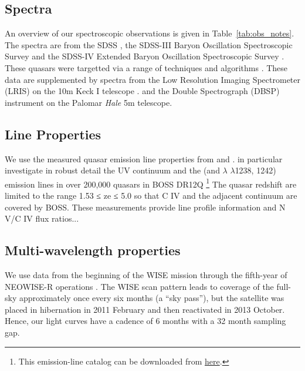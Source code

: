 \documentclass[a4paper,fleqn,usenatbib]{mnras}
\begin{document}
\subsection{Spectra}
An overview of our spectroscopic observations is given in Table~\ref{tab:obs_notes}. 
The spectra are from the SDSS \citep{Stoughton2002, DR7, Schneider2010},  
the SDSS-III Baryon Oscillation Spectroscopic Survey \citep[BOSS][]{Eisenstein2011, Dawson2013, Smee2013, Alam2015, Paris2017} 
and the SDSS-IV  Extended Baryon Oscillation Spectroscopic Survey \citep[eBOSS; ][]{Dawson2016, Abolfathi2018}. 
These quasars were targetted via a range of techniques and algorithms \citep[][]{Richards2002, Ross2012, 
Myers2015}.  
These data are supplemented by spectra from 
the Low Resolution Imaging Spectrometer (LRIS) on the 10m Keck {\sc I} telescope \citep{Oke1995}. 
and the Double Spectrograph (DBSP) instrument on the Palomar {\it Hale} 5m telescope. 


\subsection{Line Properties}  
We use the measured quasar emission line properties from \citet{Shen2011} and \citet{Hamann2017}. \citet{Hamann2017} in particular investigate in robust detail the UV continuum and the \civ (and \nv $\lambda$ $\lambda$1238, 1242) emission lines in over 200,000 quasars in BOSS DR12Q \citep{Paris2017}\footnote{This emission-line catalog can be downloaded from \href{https://datadryad.org/stash/dataset/doi:10.6086/D1H59V}{here}.} The quasar redshift are limited to the range 1.53 ≤ ze ≤ 5.0 so that C IV and the adjacent continuum are covered by BOSS. These measurements provide line profile information and N V/C IV flux ratios... 


\subsection{Multi-wavelength properties}
We use data from the beginning of the WISE mission \citep[2010
January; ][]{Wright2010} through the fifth-year of NEOWISE-R
operations \citep[2018 December; ][]{Mainzer2011}. The WISE scan
pattern leads to coverage of the full-sky approximately once every six
months (a ``sky pass''), but the satellite was placed in hibernation
in 2011 February and then reactivated in 2013 October. Hence, our
light curves have a cadence of 6 months with a 32 month sampling gap.
\end{document}
